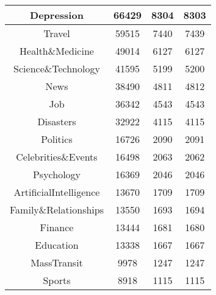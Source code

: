 \begin{table}[]
{\begin{tabular}{|c||c|c|c|}
Depression & 66429 & 8304 & 8303 \\ \hline 
Travel & 59515 & 7440 & 7439 \\ \hline 
Health\&Medicine & 49014 & 6127 & 6127 \\ \hline 
Science\&Technology & 41595 & 5199 & 5200 \\ \hline 
News & 38490 & 4811 & 4812 \\ \hline 
Job & 36342 & 4543 & 4543 \\ \hline 
Disasters & 32922 & 4115 & 4115 \\ \hline 
Politics & 16726 & 2090 & 2091 \\ \hline 
Celebrities\&Events & 16498 & 2063 & 2062 \\ \hline 
Psychology & 16369 & 2046 & 2046 \\ \hline 
ArtificialIntelligence & 13670 & 1709 & 1709 \\ \hline 
Family\&Relationships & 13550 & 1693 & 1694 \\ \hline 
Finance & 13444 & 1681 & 1680 \\ \hline 
Education & 13338 & 1667 & 1667 \\ \hline 
MassTransit & 9978 & 1247 & 1247 \\ \hline 
Sports & 8918 & 1115 & 1115 \\ \hline 
\end{tabular}}
\end{table}

